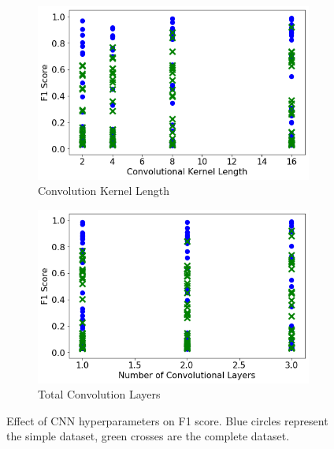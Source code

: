 \begin{figure}[H]
     \begin{subfigure}[b]{0.49\textwidth}
         \centering
         \includegraphics[width=\textwidth]{images/cnn_kernel_length.png}
         \caption{Convolution Kernel Length}
         \label{fig:cnn_kernel_length}
     \end{subfigure}
     \hfill
     \begin{subfigure}[b]{0.49\textwidth}
         \centering
         \includegraphics[width=\textwidth]{images/cnn_num_conv_layers.png}
         \caption{Total Convolution Layers}
         \label{fig:cnn_num_conv_layers}
     \end{subfigure}  
    \caption{Effect of CNN hyperparameters on F1 score. Blue circles represent the simple dataset, green crosses are the complete dataset.}
\end{figure}

